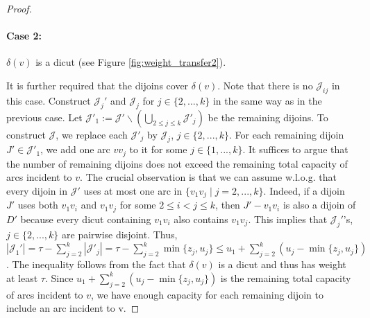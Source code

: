 \documentclass[runningheads]{llncs}
\begin{document}
\begin{proof}
    \paragraph{\textbf{Case 2}:} $\delta(v)$ is a dicut (see Figure \ref{fig:weight_transfer2}). 
    
    It is further required that the dijoins cover $\delta(v)$. 
    Note that there is no $\mathcal{J}_{ij}$ in this case.
    Construct $\mathcal{J}_{j}'$ and $\mathcal{J}_{j}$ for $j\in\{2,...,k\}$ in the same way as in the previous case. Let $\mathcal{J}'_1:=\mathcal{J}'\backslash(\bigcup_{2\leq j\leq k} \mathcal{J}'_j)$
    be the remaining dijoins. To construct $\mathcal{J}$, we replace each $\mathcal{J}'_j$ by $\mathcal{J}_j$, $j\in\{2,...,k\}$. For each remaining dijoin $J'\in \mathcal{J}'_1$, we add one arc $vv_j$ to it for some $j\in \{1,...,k\}$. It suffices to argue that the number of remaining dijoins does not exceed the remaining total capacity of arcs incident to $v$.
    The crucial observation is that we can assume w.l.o.g. that every dijoin in $\mathcal{J}'$ uses at most one arc in $\{v_1v_j\mid j=2,...,k\}$. Indeed, if a dijoin $J'$ uses both $v_1v_i$ and $v_1v_j$ for some $2\leq i<j\leq k$, then $J'-v_1v_i$ is also a dijoin of $D'$ because every dicut containing $v_1v_i$ also contains $v_1v_j$. This implies that $\mathcal{J}_j'$'s, $j\in\{2,...,k\}$ are pairwise disjoint.
    Thus, $|\mathcal{J}_1'|=\tau-\sum_{j=2}^k |\mathcal{J}'_j|=\tau-\sum_{j=2}^k \min\{z_j, u_j\}\leq u_1+\sum_{j=2}^k (u_j-\min\{z_j, u_j\})$. The inequality follows from the fact that $\delta(v)$ is a dicut and thus has weight at least $\tau$. Since $u_1+\sum_{j=2}^k (u_j-\min\{z_j, u_j\})$ is the remaining total capacity of arcs incident to $v$, we have enough capacity for each remaining dijoin to include an arc incident to v. 
    
    \end{proof}
\end{document}
